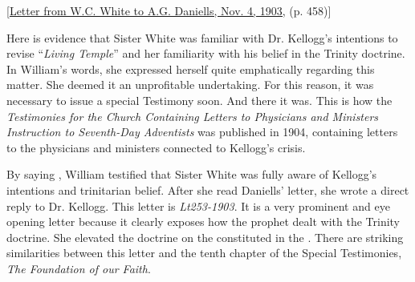 [\href{https://ellenwhite.org/letterbooks/555}{Letter from W.C. White to A.G. Daniells, Nov. 4, 1903,} (p. 458)]

Here is evidence that Sister White was familiar with Dr. Kellogg's intentions to revise “\textit{Living Temple}” and her familiarity with his belief in the Trinity doctrine. In William's words, she expressed herself quite emphatically regarding this matter. She deemed it an unprofitable undertaking. For this reason, it was necessary to issue a special Testimony soon. And there it was. This is how the \textit{Testimonies for the Church Containing Letters to Physicians and Ministers Instruction to Seventh-Day Adventists} was published in 1904, containing letters to the physicians and ministers connected to Kellogg's crisis.  

By saying , William testified that Sister White was fully aware of Kellogg's intentions and trinitarian belief. After she read Daniells’ letter, she wrote a direct reply to Dr. Kellogg. This letter is \textit{Lt253-1903}. It is a very prominent and eye opening letter because it clearly exposes how the prophet dealt with the Trinity doctrine. She elevated the doctrine on the  constituted in the . There are striking similarities between this letter and the tenth chapter of the Special Testimonies, \textit{The Foundation of our Faith}.

